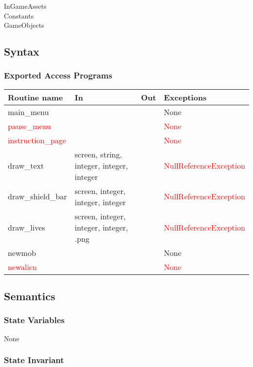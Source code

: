 \documentclass[12pt, titlepage]{article}
\begin{document}
\noindent InGameAssets\\
\noindent Constants \\
\noindent GameObjects 

\subsection* {Syntax}

\subsubsection* {Exported Access Programs}

\begin{tabular}{| l | l | l | p{5cm} |}
\hline
\textbf{Routine name} & \textbf{In} & \textbf{Out} & \textbf{Exceptions}\\
\hline
main\_menu & & & None\\
\hline
\textcolor{red}{pause\_menu} & & & \textcolor{red}{None}\\
\hline
\textcolor{red}{instruction\_page} & & & \textcolor{red}{None}\\
\hline
draw\_text & screen, string, integer, integer, integer & & \textcolor{red}{NullReferenceException}\\
\hline
draw\_shield\_bar & screen, integer, integer, integer & & \textcolor{red}{NullReferenceException}\\
\hline
draw\_lives & screen, integer, integer, integer, .png & & \textcolor{red}{NullReferenceException}\\
\hline
newmob & & & None\\
\hline
\textcolor{red}{newalien} & & & \textcolor{red}{None}\\
\hline
\end{tabular}

\subsection* {Semantics}

\subsubsection* {State Variables}

None

\subsubsection* {State Invariant}
\end{document}
